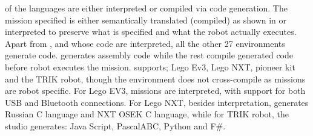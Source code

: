 


 of the languages are either interpreted or compiled via code generation. The mission specified is either semantically translated (compiled) as shown in  or interpreted to preserve what is specified and what the robot actually executes. Apart from \lego, and \codelab whose code are interpreted, all the other 27 environments generate code. \metabot generates assembly code while the rest compile generated code before robot executes the mission.  \trik supports; Lego Ev3, Lego NXT, pioneer kit and the TRIK robot, though the environment does not cross-compile as missions are robot specific. For Lego EV3, missions are interpreted, with support for both USB and Bluetooth connections.
For Lego NXT, besides interpretation, \trik generates Russian C language and NXT OSEK C language, while for TRIK robot, the studio generates: Java Script, PascalABC, Python and F\#.%




